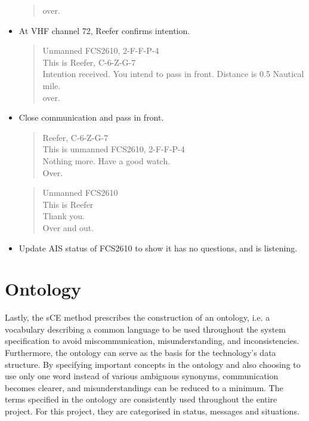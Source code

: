 \begin{itemize}
\begin{quote}
		over.
	\end{quote}
	\item At \ac{VHF} channel 72, Reefer confirms intention.
	\begin{quote}
		Unmanned FCS2610, 2-F-F-P-4 \\
		This is Reefer, C-6-Z-G-7\\
		Intention received. You intend to pass in front. Distance is 0.5 Nautical mile.\\
		over.
	\end{quote}
	\item Close communication and pass in front.
	\begin{quote}
		Reefer, C-6-Z-G-7\\
		This is unmanned FCS2610, 2-F-F-P-4 \\
		Nothing more. Have a good watch. \\
		Over.
	\end{quote}
	\begin{quote}
		Unmanned FCS2610\\
		This is Reefer\\
		Thank you. \\
		Over and out.
	\end{quote}
	\item Update AIS status of FCS2610 to show it has no questions, and is listening.
\end{itemize}

\section{Ontology}
Lastly, the sCE method prescribes the construction of an ontology, i.e. a vocabulary describing a common language to be used throughout the system specification to avoid miscommunication, misunderstanding, and inconsistencies. Furthermore, the ontology can serve as the basis for the technology’s data structure. By specifying important concepts in the ontology and also choosing to use only one word instead of various ambiguous synonyms, communication becomes clearer, and misunderstandings can be reduced to a minimum. The terms specified in the ontology are consistently used throughout the entire project. For this project, they are categorised in status, messages and situations.

